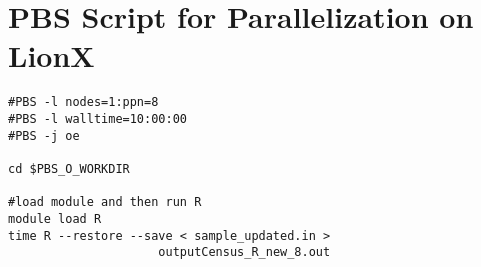 \documentclass[journal]{/home/hoofar/LatexClasses/IEEEtran}
\begin{document}
\appendices
\section{PBS Script for Parallelization on LionX}
\begin{verbatim}
#PBS -l nodes=1:ppn=8
#PBS -l walltime=10:00:00
#PBS -j oe
    
cd $PBS_O_WORKDIR

#load module and then run R 
module load R
time R --restore --save < sample_updated.in >
					 outputCensus_R_new_8.out
 
\end{verbatim}
\newpage
 
 \begin{verbatim}
 
 
 
 
 
 
 
 
 
 
 
 
 
 
 
 
 
 
 
 
 
 
 
 
 
 
 
 
 
 
 
 
 
 
 
 
 
 
 
 
 
 
 
 
 
 
 
 
 
 
 
 
 
 
 
 
 \end{verbatim} 
\end{document}

